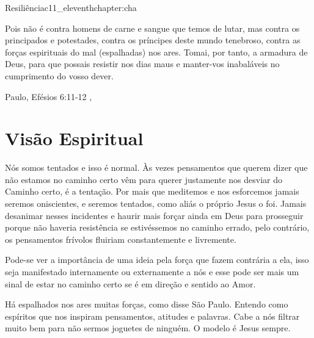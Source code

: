 \begin{chapterpage}{Resiliência}{c11_eleventhchapter:cha}

\begin{myquotation} Pois não é contra homens de carne e sangue que temos de lutar, mas contra os principados e potestades, contra os príncipes deste mundo tenebroso, contra as forças espirituais do mal (espalhadas) nos ares. 
Tomai, por tanto, a armadura de Deus, para que possais resistir nos dias maus e manter-vos inabaláveis no cumprimento do vosso dever. 

\par\vspace*{15mm}
\mbox{}\hfill \emdash{}Paulo, Efésios 6:11-12 
, %
\par\end{myquotation}

\end{chapterpage}



\section{Visão Espiritual}\label{c1_basicformatting:sec}

\emdash{}Nós somos tentados e isso é normal. Às vezes pensamentos que querem dizer que não estamos no caminho certo vêm para querer justamente nos desviar do Caminho certo, é a tentação. 
Por mais que meditemos e nos esforcemos jamais seremos oniscientes,  e seremos tentados, como aliás o próprio Jesus o foi. Jamais desanimar nesses incidentes e haurir mais forçar ainda em Deus para prosseguir porque não haveria resistência se estivéssemos no caminho errado, pelo contrário, os pensamentos frívolos fluiriam constantemente e livremente.

\emdash{}Pode-se ver a importância de uma ideia pela força que fazem contrária a ela, isso seja manifestado internamente ou externamente a nós e esse pode ser mais um sinal de estar no caminho certo se é em direção e sentido ao Amor.

\emdash{}Há espalhados nos ares muitas forças, como disse São Paulo. Entendo como espíritos que nos inspiram pensamentos, atitudes e palavras. Cabe a nós filtrar muito bem para não sermos joguetes de ninguém. O modelo é Jesus sempre. 

